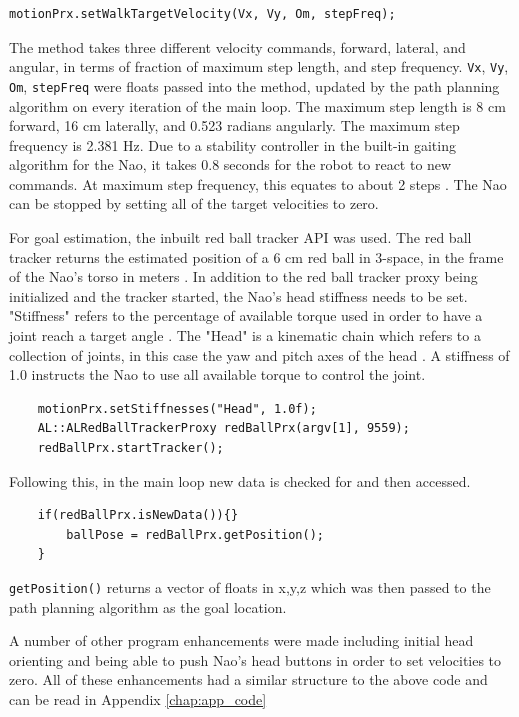\begin{lstlisting}  
motionPrx.setWalkTargetVelocity(Vx, Vy, Om, stepFreq);
\end{lstlisting}

The method takes three different velocity commands, forward, lateral, and angular, in terms of fraction of maximum step length, and step frequency. \lstinline$Vx$, \lstinline$Vy$, \lstinline$Om$, \lstinline$stepFreq$ were floats passed into the method, updated by the path planning algorithm on every iteration of the main loop. The maximum step length is 8 cm forward, 16 cm laterally, and 0.523 radians angularly. The maximum step frequency is 2.381 Hz. Due to a stability controller in the built-in gaiting algorithm for the Nao, it takes 0.8 seconds for the robot to react to new commands. At maximum step frequency, this equates to about 2 steps \cite{naodoc_motion1}. The Nao can be stopped by setting all of the target velocities to zero.

For goal estimation, the inbuilt red ball tracker API was used. The red ball tracker returns the estimated position of a 6 cm red ball in 3-space, in the frame of the Nao's torso in meters \cite{naodoc_track1}.
In addition to the red ball tracker proxy being initialized and the tracker started, the Nao's head stiffness needs to be set. "Stiffness" refers to the percentage of available torque used in order to have a joint reach a target angle \cite{naodoc_stiff1}. The "Head" is a kinematic chain which refers to a collection of joints, in this case the yaw and pitch axes of the head \cite{naodoc_motion3}. A stiffness of 1.0 instructs the Nao to use all available torque to control the joint.

\begin{lstlisting}
	motionPrx.setStiffnesses("Head", 1.0f);
	AL::ALRedBallTrackerProxy redBallPrx(argv[1], 9559);
	redBallPrx.startTracker();
\end{lstlisting}

Following this, in the main loop new data is checked for and then accessed.
\begin{lstlisting}
	if(redBallPrx.isNewData()){}
		ballPose = redBallPrx.getPosition();
	}
\end{lstlisting}
\lstinline$getPosition()$ returns a vector of floats in x,y,z which was then passed to the path planning algorithm as the goal location.

A number of other program enhancements were made including initial head orienting and being able to push Nao's head buttons in order to set velocities to zero. All of these enhancements had a similar structure to the above code and can be read in Appendix \ref{chap:app_code}




